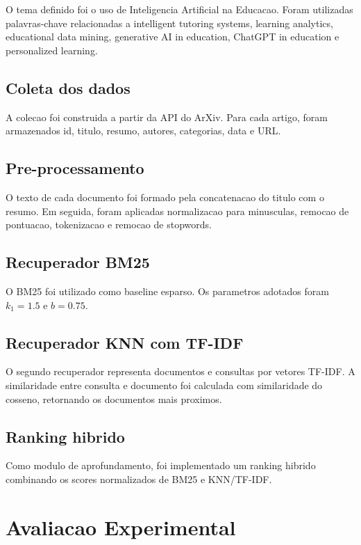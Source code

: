 \documentclass[12pt]{article}
\begin{document}
O tema definido foi o uso de Inteligencia Artificial na Educacao. Foram utilizadas palavras-chave relacionadas a intelligent tutoring systems, learning analytics, educational data mining, generative AI in education, ChatGPT in education e personalized learning.

\subsection{Coleta dos dados}

A colecao foi construida a partir da API do ArXiv. Para cada artigo, foram armazenados id, titulo, resumo, autores, categorias, data e URL.

\subsection{Pre-processamento}

O texto de cada documento foi formado pela concatenacao do titulo com o resumo. Em seguida, foram aplicadas normalizacao para minusculas, remocao de pontuacao, tokenizacao e remocao de stopwords.

\subsection{Recuperador BM25}

O BM25 foi utilizado como baseline esparso. Os parametros adotados foram $k_1=1.5$ e $b=0.75$.

\subsection{Recuperador KNN com TF-IDF}

O segundo recuperador representa documentos e consultas por vetores TF-IDF. A similaridade entre consulta e documento foi calculada com similaridade do cosseno, retornando os documentos mais proximos.

\subsection{Ranking hibrido}

Como modulo de aprofundamento, foi implementado um ranking hibrido combinando os scores normalizados de BM25 e KNN/TF-IDF.

\section{Avaliacao Experimental}
\end{document}
